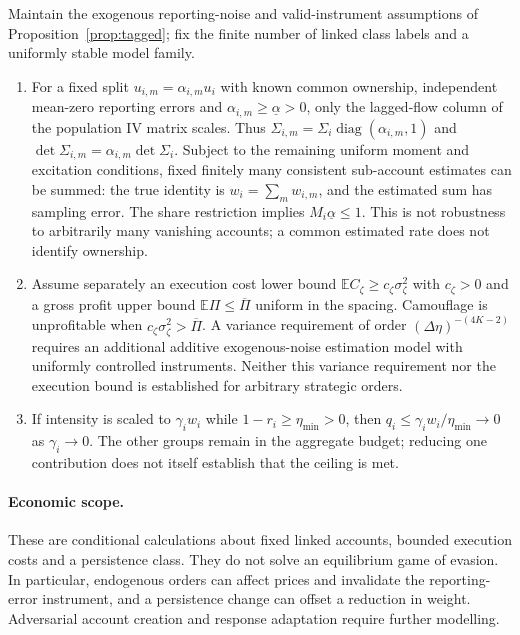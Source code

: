 \begin{proposition}\label{prop:strategic}
Maintain the exogenous reporting-noise and valid-instrument assumptions of Proposition~\ref{prop:tagged}; fix the finite number of linked class labels and a uniformly stable model family.
\begin{enumerate}[label=(\roman*)]
\item For a fixed split $u_{i,m}=\alpha_{i,m}u_i$ with known common ownership, independent mean-zero reporting errors and $\alpha_{i,m}\ge\underline\alpha>0$, only the lagged-flow column of the population IV matrix scales. Thus $\Sigma_{i,m}=\Sigma_i\operatorname{diag}(\alpha_{i,m},1)$ and $\det\Sigma_{i,m}=\alpha_{i,m}\det\Sigma_i$. Subject to the remaining uniform moment and excitation conditions, fixed finitely many consistent sub-account estimates can be summed: the true identity is $w_i=\sum_m w_{i,m}$, and the estimated sum has sampling error. The share restriction implies $M_i\underline\alpha\le1$. This is not robustness to arbitrarily many vanishing accounts; a common estimated rate does not identify ownership.
\item Assume separately an execution cost lower bound $\mathbb E C_\zeta\ge c_\zeta\sigma_\zeta^2$ with $c_\zeta>0$ and a gross profit upper bound $\mathbb E\Pi\le\overline\Pi$ uniform in the spacing. Camouflage is unprofitable when $c_\zeta\sigma_\zeta^2>\overline\Pi$. A variance requirement of order $(\Delta\eta)^{-(4K-2)}$ requires an additional additive exogenous-noise estimation model with uniformly controlled instruments. Neither this variance requirement nor the execution bound is established for arbitrary strategic orders.
\item If intensity is scaled to $\gamma_iw_i$ while $1-r_i\ge\eta_{\min}>0$, then $q_i\le\gamma_iw_i/\eta_{\min}\to0$ as $\gamma_i\to0$. The other groups remain in the aggregate budget; reducing one contribution does not itself establish that the ceiling is met.
\end{enumerate}
\end{proposition}

\paragraph{Economic scope.} These are conditional calculations about fixed linked accounts, bounded execution costs and a persistence class. They do not solve an equilibrium game of evasion. In particular, endogenous orders can affect prices and invalidate the reporting-error instrument, and a persistence change can offset a reduction in weight. Adversarial account creation and response adaptation require further modelling.

